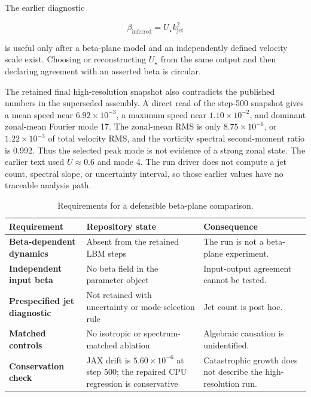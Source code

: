 The earlier diagnostic

\begin{equation}
  \beta_{\mathrm{inferred}} = U_{\star} k_{\mathrm{jet}}^2
\end{equation}

is useful only after a beta-plane model and an independently defined velocity
scale exist. Choosing or reconstructing $U_{\star}$ from the same output and
then declaring agreement with an asserted beta is circular.

The retained final high-resolution snapshot also contradicts the published
numbers in the superseded assembly. A direct read of the step-500 snapshot gives
a mean speed near $6.92\times10^{-3}$, a maximum speed near
$1.10\times10^{-2}$, and dominant zonal-mean Fourier mode 17. The zonal-mean
RMS is only $8.75\times10^{-6}$, or $1.22\times10^{-3}$ of total velocity RMS,
and the vorticity spectral second-moment ratio is 0.992. Thus the selected peak
mode is not evidence of a strong zonal state. The earlier text used
$U\approx0.6$ and mode 4. The run driver does not compute a jet count, spectral
slope, or uncertainty interval, so those earlier values have no traceable
analysis path.

\begin{table}[htbp]
  \centering
  \caption{Requirements for a defensible beta-plane comparison.}
  \label{tab:beta-requirements}
  \begin{tabularx}{\textwidth}{>{\raggedright\arraybackslash\bfseries}p{}YY}
    \toprule
    Requirement & Repository state & Consequence \\
    \midrule
    Beta-dependent dynamics & Absent from the retained LBM steps & The run is not a beta-plane experiment. \\
    Independent input beta & No beta field in the parameter object & Input-output agreement cannot be tested. \\
    Prespecified jet diagnostic & Not retained with uncertainty or mode-selection rule & Jet count is post hoc. \\
    Matched controls & No isotropic or spectrum-matched ablation & Algebraic causation is unidentified. \\
    Conservation check & JAX drift is $5.60\times10^{-6}$ at step 500; the repaired CPU regression is conservative & Catastrophic growth does not describe the high-resolution run. \\
    \bottomrule
  \end{tabularx}
\end{table}


